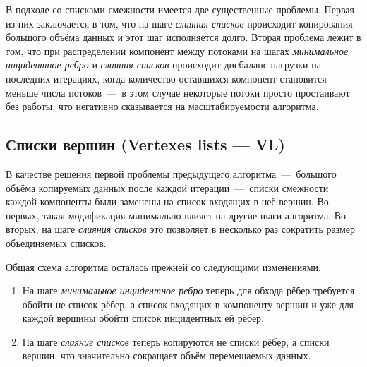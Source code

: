 \documentclass[a4paper,10pt]{extarticle}
\begin{document}
В  подходе со списками смежности имеется две существенные проблемы. 
Первая из них заключается в том, что на шаге \textit{слияния списков} происходит копирования большого объёма данных и этот шаг исполняется долго.
Вторая проблема лежит в том, что при распределении компонент между потоками на шагах \textit{минимальное инцидентное ребро} и \textit{слияния списков} происходит дисбаланс нагрузки на последних итерациях, когда количество оставшихся компонент становится меньше числа потоков~---~в этом случае некоторые потоки просто простаивают без работы, что негативно сказывается на масштабируемости алгоритма.


\subsection{Списки вершин (Vertexes lists --- VL)}
\label{subsec:boruvkaVL}


В качестве решения первой проблемы предыдущего алгоритма~---~большого объёма копируемых данных после каждой итерации~---~списки смежности каждой компоненты были заменены на список входящих в неё вершин. Во-первых, такая модификация минимально влияет на другие шаги алгоритма. Во-вторых, на шаге \textit{слияния списков} это позволяет в несколько раз сократить размер объединяемых списков.

Общая схема алгоритма осталась прежней со следующими изменениями:
\begin{enumerate}
    \item На шаге \textit{минимальное инцидентное ребро} теперь для обхода рёбер требуется обойти не список рёбер, а список входящих в компоненту вершин и уже для каждой вершины обойти список инцидентных ей рёбер.
    \item На шаге \textit{слияние списков} теперь копируются не списки рёбер, а списки вершин, что значительно сокращает объём перемещаемых данных.
\end{enumerate}
\end{document}
